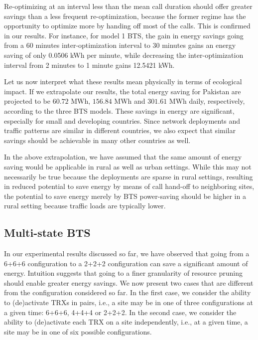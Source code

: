Re-optimizing at an interval less than the mean call duration should offer greater savings than a less frequent re-optimization, because the former regime has the opportunity to optimize more by handing off most of the calls. This is confirmed in our results. For instance, for model 1 BTS, the gain in energy savings going from a 60 minutes inter-optimization interval to 30 minutes gains an energy saving of only 0.0506 kWh per minute, while decreasing the inter-optimization interval from 2 minutes to 1 minute gains 12.5421 kWh. %

Let us now interpret what these results mean physically in terms of ecological impact. If we extrapolate our results, the total energy saving for Pakistan are projected to be $60.72$ MWh, $156.84$ MWh and $301.61$ MWh daily, respectively, according to the three BTS models. These savings in energy are significant, especially for small and developing countries. Since network deployments and traffic patterns are similar in different countries, we also expect that similar savings should be achievable in many other countries as well.

In the above extrapolation, we have assumed that the same amount of energy saving would be applicable in rural as well as urban settings. While this may not necessarily be true because the deployments are sparse in rural settings, resulting in reduced potential to save energy by means of call hand-off to neighboring sites, the potential to save energy merely by BTS power-saving should be higher in a rural setting because traffic loads are typically lower.

\subsection{Multi-state BTS}
\label{subsec:results2}
In our experimental results discussed so far, we have observed that going from a 6+6+6 configuration to a 2+2+2 configuration can save a significant amount of energy. Intuition suggests that going to a finer granularity of resource pruning should enable greater energy savings. We now present two cases that are different from the configuration considered so far. In the first case, we consider the ability to (de)activate TRXs in pairs, i.e., a site may be in one of three configurations at a given time: 6+6+6, 4+4+4 or 2+2+2. In the second case, we consider the ability to (de)activate each TRX on a site independently, i.e., at a given time, a site may be in one of six possible configurations. 

